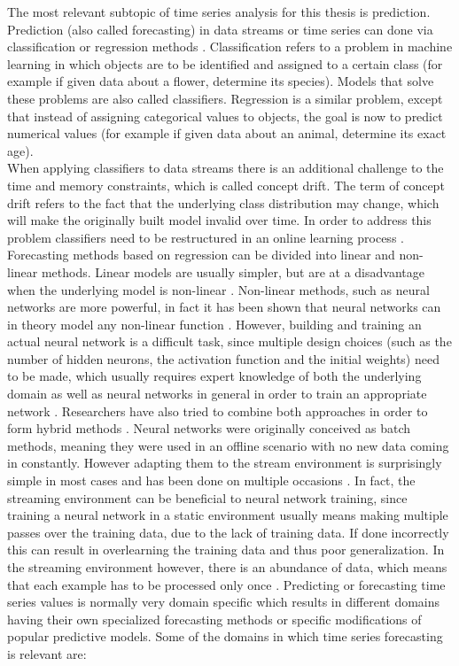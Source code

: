 The most relevant subtopic of time series analysis for this thesis is prediction. Prediction (also called forecasting) in data streams or time series can done via classification \cite{leung2000forecasting} or regression methods \cite{alzghoul2012data}. Classification refers to a problem in machine learning in which objects are to be identified and assigned to a certain class (for example if given data about a flower, determine its species). Models that solve these problems are also called classifiers. Regression is a similar problem, except that instead of assigning categorical values to objects, the goal is now to predict numerical values (for example if given data about an animal, determine its exact age). \\
When applying classifiers to data streams there is an additional challenge to the time and memory constraints, which is called concept drift. The term of concept drift refers to the fact that the underlying class distribution may change, which will make the originally built model invalid over time. In order to address this problem classifiers need to be restructured in an online learning process \cite{wang2003mining}. \\
Forecasting methods based on regression can be divided into linear and non-linear methods. Linear models are usually simpler, but are at a disadvantage when the underlying model is non-linear \cite{zhang2003time}. Non-linear methods, such as neural networks are more powerful, in fact it has been shown that neural networks can in theory model any non-linear function \cite{abraham2005artificial} \cite{funahashi1989approximate}. However, building and training an actual neural network is a difficult task, since multiple design choices (such as the number of hidden neurons, the activation function and the initial weights) need to be made, which usually requires expert knowledge of both the underlying domain as well as neural networks in general in order to train an appropriate network \cite{abraham2005artificial}. Researchers have also tried to combine both approaches in order to form hybrid methods \cite{zhang2003time}. \newline
Neural networks were originally conceived as batch methods, meaning they were used in an offline scenario with no new data coming in constantly. However adapting them to the stream environment is surprisingly simple in most cases and has been done on multiple occasions \cite{chang2002real} \cite{frank2001time}. In fact, the streaming environment can be beneficial to neural network training, since training a neural network in a static environment usually means making multiple passes over the training data, due to the lack of training data. If done incorrectly this can result in overlearning the training data and thus poor generalization. In the streaming environment however, there is an abundance of data, which means that each example has to be processed only once \cite{gama2010knowledge}. \newline
Predicting or forecasting time series values is normally very domain specific which results in different domains having their own specialized forecasting methods or specific modifications of popular predictive models. Some of the domains in which time series forecasting is relevant are:

